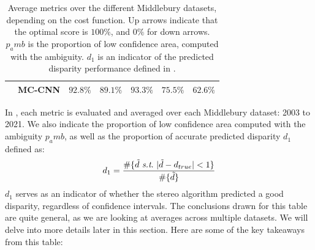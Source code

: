 \begin{table}[ht!]
\begin{tabular}{|c|c||c|c|c|c|c|}
\rowcolor{color_mccnn}
\multirow{-2}{*}{\cellcolor{white} $d_1$} & MC-CNN & $92.8\%$ & $89.1\%$ & $93.3\%$ & $75.5\%$ & $62.6\%$\\\hline

\end{tabular}
\renewcommand{\arraystretch}{1}
\caption{Average metrics over the different Middlebury datasets, depending on the cost function. Up arrows indicate that the optimal score is $100\%$, and $0\%$ for down arrows. $p_amb$ is the proportion of low confidence area, computed with the ambiguity. $d_1$ is an indicator of the predicted disparity performance defined in .}\label{tab:metric_average}
\end{table}

In , each metric is evaluated and averaged over each Middlebury dataset: 2003 to 2021. We also indicate the proportion of low confidence area computed with the ambiguity $p_amb$, as well as the proportion of accurate predicted disparity $d_1$ defined as:
\begin{align}
    d_1 = \dfrac{\#\{\tilde{d}~\st~|\tilde{d}-d_{true}|<1\}}{\#\{\tilde{d}\}} \label{eq:predicted_disparity_correct}
\end{align}
$d_1$ serves as an indicator of whether the stereo algorithm predicted a good disparity, regardless of confidence intervals. The conclusions drawn for this table are quite general, as we are looking at averages across multiple datasets. We will delve into more details later in this section. Here are some of the key takeaways from this table:
